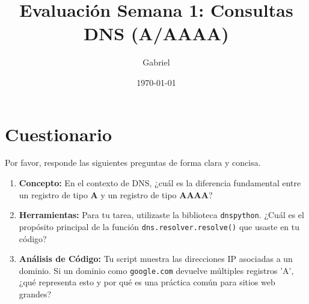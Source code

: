 \documentclass{article}
\title{Evaluación Semana 1: Consultas DNS (A/AAAA)}
\author{Gabriel}
\date{\today}
\begin{document}
\maketitle

\section*{Cuestionario}

Por favor, responde las siguientes preguntas de forma clara y concisa.

\begin{enumerate}
    \item \textbf{Concepto:} En el contexto de DNS, ¿cuál es la diferencia fundamental entre un registro de tipo \textbf{A} y un registro de tipo \textbf{AAAA}?

    \item \textbf{Herramientas:} Para tu tarea, utilizaste la biblioteca \texttt{dnspython}. ¿Cuál es el propósito principal de la función \texttt{dns.resolver.resolve()} que usaste en tu código?

    \item \textbf{Análisis de Código:} Tu script muestra las direcciones IP asociadas a un dominio. Si un dominio como \texttt{google.com} devuelve múltiples registros 'A', ¿qué representa esto y por qué es una práctica común para sitios web grandes?

\end{enumerate}
\end{document}
